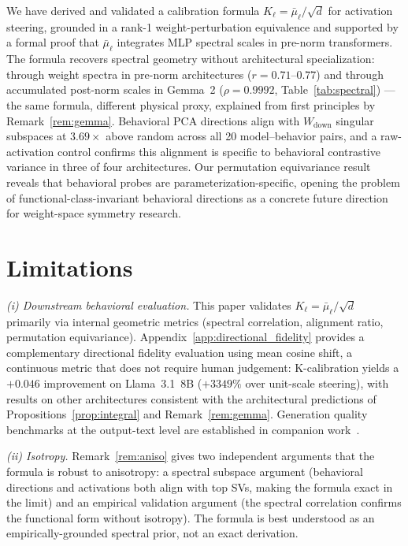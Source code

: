 \documentclass{article}
\newcommand{\mubar}{\bar{\mu}}
\newcommand{\Wdn}{W_{\!\mathrm{down}}}
\begin{document}
We have derived and validated a calibration formula $K_\ell = \mubar_\ell/\!\sqrt{d}$
for activation steering, grounded in a rank-1 weight-perturbation equivalence and
supported by a formal proof that $\mubar_\ell$ integrates MLP spectral scales in
pre-norm transformers.
The formula recovers spectral geometry without architectural specialization: through
weight spectra in pre-norm architectures ($r{=}0.71$--$0.77$) and through accumulated
post-norm scales in Gemma~2 ($\rho{=}0.9992$, Table~\ref{tab:spectral}) — the same
formula, different physical proxy, explained from first principles by Remark~\ref{rem:gemma}.
Behavioral PCA directions align with $\Wdn$ singular subspaces at $3.69\times$ above
random across all 20 model--behavior pairs, and a raw-activation control confirms this
alignment is specific to behavioral contrastive variance in three of four architectures.
Our permutation equivariance result reveals that behavioral probes are
parameterization-specific, opening the problem of functional-class-invariant behavioral
directions as a concrete future direction for weight-space symmetry research.

\section*{Limitations}

\textit{(i) Downstream behavioral evaluation.}
This paper validates $K_\ell = \mubar_\ell/\!\sqrt{d}$ primarily via internal geometric
metrics (spectral correlation, alignment ratio, permutation equivariance).
Appendix~\ref{app:directional_fidelity} provides a complementary directional fidelity
evaluation using mean cosine shift, a continuous metric that does not require human
judgement: K-calibration yields a $+0.046$ improvement on Llama~3.1~8B
($+3349\%$ over unit-scale steering), with results on other architectures
consistent with the architectural predictions of Propositions~\ref{prop:integral}
and Remark~\ref{rem:gemma}.
Generation quality benchmarks at the output-text level are established in
companion work~\citep{avaw2026}.

\textit{(ii) Isotropy.}
Remark~\ref{rem:aniso} gives two independent arguments that the formula is robust to
anisotropy: a spectral subspace argument (behavioral directions and activations both align
with top SVs, making the formula exact in the limit) and an empirical validation
argument (the spectral correlation confirms the functional form without isotropy).
The formula is best understood as an empirically-grounded spectral prior, not an exact
derivation.
\end{document}
